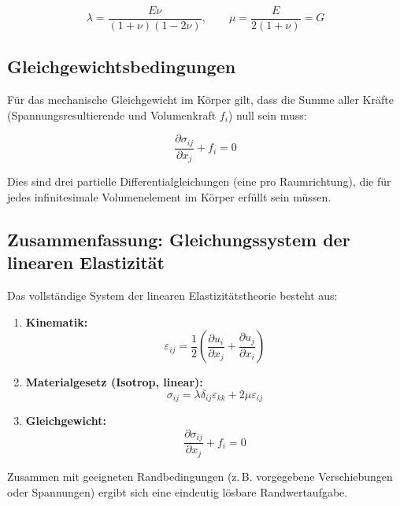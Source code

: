 \begin{equation}
	\lambda = \frac{E \nu}{(1+\nu)(1-2\nu)}, \qquad \mu = \frac{E}{2(1+\nu)} = G
\end{equation}

\subsection{Gleichgewichtsbedingungen}

Für das mechanische Gleichgewicht im Körper gilt, dass die Summe aller Kräfte (Spannungsresultierende und Volumenkraft $f_i$) null sein muss:

\begin{equation}
	\frac{\partial \sigma_{ij}}{\partial x_j} + f_i = 0
\end{equation}

Dies sind drei partielle Differentialgleichungen (eine pro Raumrichtung), die für jedes infinitesimale Volumenelement im Körper erfüllt sein müssen.

\subsection{Zusammenfassung: Gleichungssystem der linearen Elastizität}

Das vollständige System der linearen Elastizitätstheorie besteht aus:
\begin{enumerate}
	\item \textbf{Kinematik:}
	\[
	\varepsilon_{ij} = \frac{1}{2} \left( \frac{\partial u_i}{\partial x_j} + \frac{\partial u_j}{\partial x_i} \right)
	\]
	
	\item \textbf{Materialgesetz (Isotrop, linear):}
	\[
	\sigma_{ij} = \lambda \delta_{ij} \varepsilon_{kk} + 2\mu \varepsilon_{ij}
	\]
	
	\item \textbf{Gleichgewicht:}
	\[
	\frac{\partial \sigma_{ij}}{\partial x_j} + f_i = 0
	\]
\end{enumerate}

Zusammen mit geeigneten Randbedingungen (z. B. vorgegebene Verschiebungen oder Spannungen) ergibt sich eine eindeutig lösbare Randwertaufgabe.